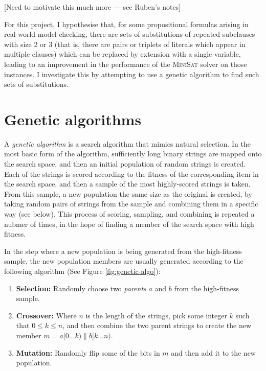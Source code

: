 \documentclass[proof,pdftex,11pt,a4,titlepage]{article}
\begin{document}
[Need to motivate this much more --- see Ruben's notes]

For this project, I hypothesise that, for some propositional formulas arising in real-world model checking, there are sets of substitutions of repeated subclauses with size 2 or 3 (that is, there are pairs or triplets of literals which appear in multiple clauses) which can be replaced by extension with a single variable, leading to an improvement in the performance of the \textsc{MiniSat} solver on those instances. I investigate this by attempting to use a genetic algorithm to find such sets of substitutions.

\section{Genetic algorithms}

A \emph{genetic algorithm} is a search algorithm that mimics natural selection. In the most basic form of the algorithm, sufficiently long binary strings are mapped onto the search space, and then an initial population of random strings is created. Each of the strings is scored according to the fitness of the corresponding item in the search space, and then a sample of the most highly-scored strings is taken. From this sample, a new population the same size as the original is created, by taking random pairs of strings from the sample and combining them in a specific way (see below). This process of scoring, sampling, and combining is repeated a nubmer of times, in the hope of finding a member of the search space with high fitness.

In the step where a new population is being generated from the high-fitness sample, the new population members are usually generated according to the following algorithm (See Figure \ref{fig:genetic-algo}):

\begin{enumerate}
  \item {\bf Selection:} Randomly choose two \emph{parents} $a$ and $b$ from the high-fitness sample.
  \item {\bf Crossover:} Where $n$ is the length of the strings, pick some integer $k$ such that $0 \leq k \leq n$, and then combine the two parent strings to create the new member $m = a[0 \ldots k) \parallel b[k \ldots n)$.
  \item {\bf Mutation:} Randomly flip some of the bits in $m$ and then add it to the new population.
\end{enumerate}
\end{document}

